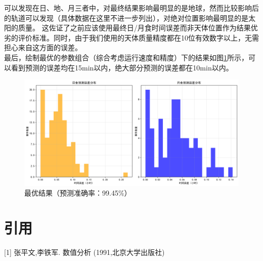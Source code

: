 \documentclass[hidelinks]{article}
\begin{document}
可以发现在日、地、月三者中，对最终结果影响最明显的是地球，然而比较影响后的轨道可以发现（具体数据在这里不进一步列出），对绝对位置影响最明显的是太阳的质量。
这佐证了之前应该使用最终日/月食时间误差而非天体位置作为结果优劣的评价标准。同时，由于我们使用的天体质量精度都在10位有效数字以上，无需担心来自这方面的误差。\\
最后，绘制最优的参数组合（综合考虑运行速度和精度）下的结果如图\ref{fig:eclipse_error_best}所示，可以看到预测的误差均在15min以内，绝大部分预测的误差都在10min以内。
\begin{figure}[H]
    \centering
    \includegraphics[width=0.5\linewidth]{images/error_distribution.png}
    \caption{最优结果（预测准确率：99.45\%）}
    \label{fig:eclipse_error_best}
\end{figure}


\section{引用}

[1] 张平文,李铁军. 数值分析 (1991,北京大学出版社)
\end{document}
